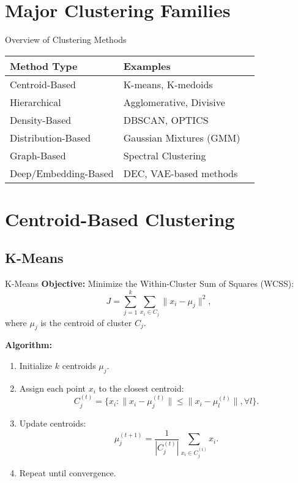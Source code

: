 \documentclass{beamer}
\begin{document}
\section{Major Clustering Families}
\begin{frame}{Overview of Clustering Methods}
    \begin{table}[htbp]
        \begin{tabular}{l l p{6cm}}
            \hline
            \textbf{Method Type} & \textbf{Examples}       \\
            \hline
            Centroid-Based       & K-means, K-medoids      \\
            Hierarchical         & Agglomerative, Divisive \\
            Density-Based        & DBSCAN, OPTICS          \\
            Distribution-Based   & Gaussian Mixtures (GMM) \\
            Graph-Based          & Spectral Clustering     \\
            Deep/Embedding-Based & DEC, VAE-based methods  \\
            \hline
        \end{tabular}
    \end{table}
\end{frame}


\section{Centroid-Based Clustering}
\subsection{K-Means}
\begin{frame}{K-Means}
    \textbf{Objective:}
    Minimize the Within-Cluster Sum of Squares (WCSS):
    \[
        J = \sum_{j=1}^{k} \sum_{x_i \in C_j} \|x_i - \mu_j\|^2,
    \]
    where $\mu_j$ is the centroid of cluster $C_j$.
    
    \textbf{Algorithm:}
    \begin{enumerate}
        \item Initialize $k$ centroids $\mu_j$.
        \item Assign each point $x_i$ to the closest centroid:
              \[
                  C_j^{(t)} = \{x_i : \|x_i - \mu_j^{(t)}\| \leq \|x_i - \mu_l^{(t)}\|, \forall l\}.
              \]
        \item Update centroids:
              \[
                  \mu_j^{(t+1)} = \frac{1}{|C_j^{(t)}|}\sum_{x_i \in C_j^{(t)}} x_i.
              \]
        \item Repeat until convergence.
    \end{enumerate}
\end{frame}
\end{document}
